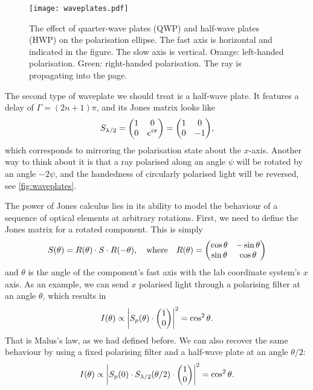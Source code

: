 \begin{figure}
	\centering
	\texttt{[image: waveplates.pdf]}
	\caption{
		The effect of quarter-wave plates (QWP) and half-wave plates (HWP) on the polarisation ellipse. The fast axis is horizontal and indicated in the figure. The slow axis is vertical. Orange: left-handed polarisation. Green: right-handed polarisation. The ray is propagating into the page.
	}
	\label{fig:waveplates}
\end{figure}

The second type of waveplate we should treat is a half-wave plate. It features a delay of $ \Gamma = (2n+1)\pi $, and its Jones matrix looks like
\begin{equation}
	S_\hwp = \mqty(1 & 0 \\ 0 & e^{i\pi}) = \mqty(1 & 0 \\ 0 & -1),
\end{equation}
which corresponds to mirroring the polarisation state about the $ x $-axis. Another way to think about it is that a ray polarised along an angle $ \psi $ will be rotated by an angle $ -2\psi $, and the handedness of circularly polarised light will be reversed, see \autoref{fig:waveplates}.

The power of Jones calculus lies in its ability to model the behaviour of a sequence of optical elements at arbitrary rotations. First, we need to define the Jones matrix for a rotated component. This is simply
\begin{equation}
	S(\theta) = R(\theta) \cdot S \cdot R(-\theta),
	\qq{where} 
	R(\theta) = \mqty(\cos\theta & -\sin\theta \\ \sin\theta & \cos\theta)
\end{equation}
and $ \theta $ is the angle of the component's fast axis with the lab coordinate system's $ x $ axis. As an example, we can send $ x $ polarised light through a polarising filter at an angle $ \theta $, which results in
\begin{equation}
	I(\theta) \propto \abs{S_p(\theta) \cdot \mqty(1 \\ 0)}^2 = \cos^2\theta.
\end{equation}
That is Malus's law, as we had defined before. We can also recover the same behaviour by using a fixed polarising filter and a half-wave plate at an angle $ \theta/2 $:
\begin{equation}
	I(\theta) \propto \abs{S_p(0) \cdot S_\hwp(\theta/2) \cdot \mqty(\admat{1 \\ 0})}^2 = \cos^2\theta.
\end{equation}

